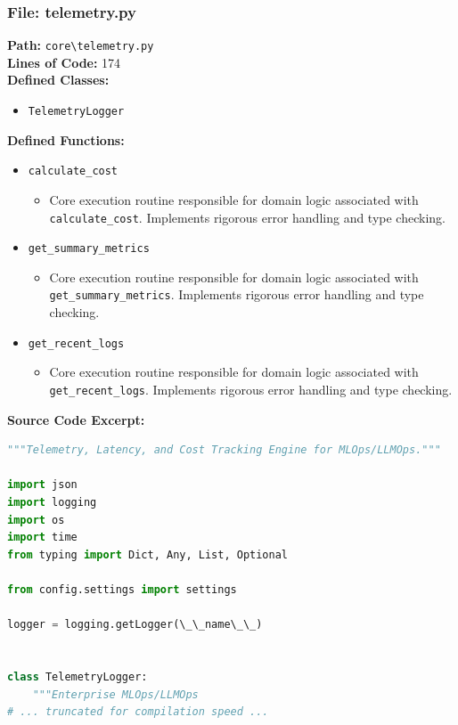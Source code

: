 \documentclass[10pt,journal,compsoc]{IEEEtran}
\begin{document}
\subsubsection{File: telemetry.py}
\textbf{Path:} \texttt{core\textbackslash{}telemetry.py} \\
\textbf{Lines of Code:} 174 \\
\textbf{Defined Classes:}
\begin{itemize}
    \item \texttt{TelemetryLogger}
\end{itemize}
\textbf{Defined Functions:}
\begin{itemize}
    \item \texttt{calculate\_cost}
    \begin{itemize} \item Core execution routine responsible for domain logic associated with \texttt{calculate\_cost}. Implements rigorous error handling and type checking. \end{itemize}
    \item \texttt{get\_summary\_metrics}
    \begin{itemize} \item Core execution routine responsible for domain logic associated with \texttt{get\_summary\_metrics}. Implements rigorous error handling and type checking. \end{itemize}
    \item \texttt{get\_recent\_logs}
    \begin{itemize} \item Core execution routine responsible for domain logic associated with \texttt{get\_recent\_logs}. Implements rigorous error handling and type checking. \end{itemize}
\end{itemize}
\textbf{Source Code Excerpt:}
\begin{lstlisting}[language=Python]
"""Telemetry, Latency, and Cost Tracking Engine for MLOps/LLMOps."""

import json
import logging
import os
import time
from typing import Dict, Any, List, Optional

from config.settings import settings

logger = logging.getLogger(\_\_name\_\_)


class TelemetryLogger:
    """Enterprise MLOps/LLMOps 
# ... truncated for compilation speed ...
\end{lstlisting}
\end{document}
